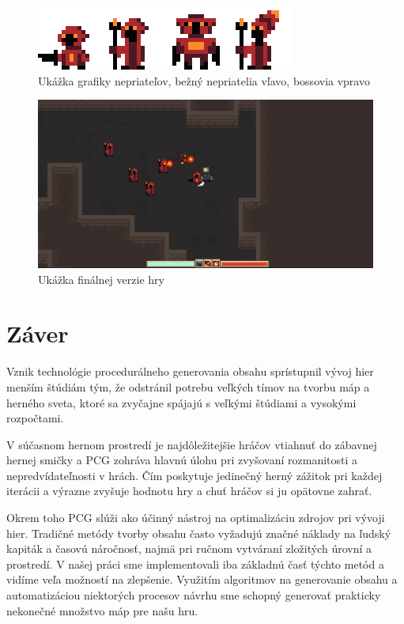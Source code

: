 \begin{figure} [H]
    \centering
    \includegraphics[width=0.55\linewidth]{obrazky-figures/enemy-types.png}
    \caption{Ukážka grafiky nepriateľov, bežný nepriatelia vľavo, bossovia vpravo}
    \label{fig:enemies}
\end{figure}

\begin{figure} [H]
    \centering
    \includegraphics[width=1\linewidth]{obrazky-figures/screen.png}
    \caption{Ukážka finálnej verzie hry}
    \label{fig:screens}
\end{figure}

\chapter{Záver}

Vznik technológie procedurálneho generovania obsahu sprístupnil vývoj hier menším štúdiám tým, že odstránil potrebu veľkých tímov na tvorbu máp a herného sveta, ktoré sa zvyčajne spájajú s veľkými štúdiami a vysokými rozpočtami.

V súčasnom hernom prostredí je najdôležitejšie hráčov vtiahnuť do zábavnej hernej smičky a PCG zohráva hlavnú úlohu pri zvyšovaní rozmanitosti a nepredvídateľnosti v hrách. Čím poskytuje jedinečný herný zážitok pri každej iterácii a výrazne zvyšuje hodnotu hry a chuť hráčov si ju opätovne zahrať.

Okrem toho PCG slúži ako účinný nástroj na optimalizáciu zdrojov pri vývoji hier. Tradičné metódy tvorby obsahu často vyžadujú značné náklady na ľudský kapiták a časovú náročnosť, najmä pri ručnom vytváraní zložitých úrovní a prostredí. V našej práci sme implementovali iba základnú časť týchto metód a vidíme veľa možností na zlepšenie. Využitím algoritmov na generovanie obsahu a automatizáciou niektorých procesov návrhu sme schopný generovať prakticky nekonečné množstvo máp pre našu hru.

